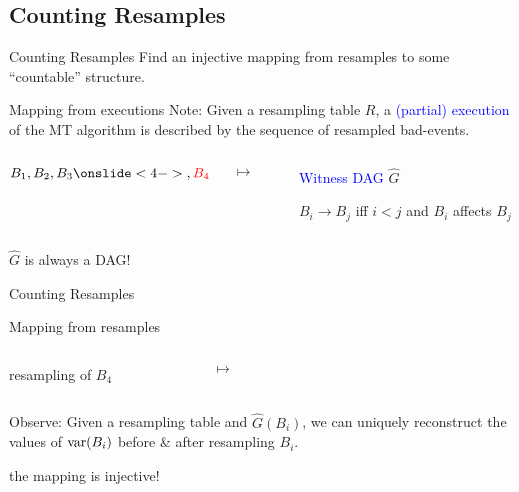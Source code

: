 \documentclass{beamer}
\def\spadding{\vspace{0.25cm}}
\def\b{\textcolor{blue}}
\def\r{\textcolor{red}}
\begin{document}
\subsection{Counting Resamples}
\begin{frame}{Counting Resamples}
Find an injective mapping from resamples to some ``countable'' structure.\pause

\begin{block}{Mapping from executions}
Note: Given a resampling table $R$, a \b{(partial) execution} of the MT algorithm is described by the sequence of resampled bad-events.\spadding

\begin{columns}
\begin{column}{.15\textwidth}
\centering $B_1, B_2, B_3\onslide<4->{, \r{B_4}}$
\end{column}
\begin{column}{.05\textwidth}
\centering $\mapsto$
\end{column}\pause
\begin{column}{.2\textwidth}
\centering\only<-3>{}
\end{column}
\begin{column}{.4\textwidth}
\b{Witness DAG} $\hat{G}$

$B_i \longrightarrow B_j$ iff $i < j$ and $B_i$ affects $B_j$
\end{column}
\end{columns}\pause\pause

\follows $\hat{G}$ is always a DAG!
\end{block}
\end{frame}

\begin{frame}{Counting Resamples}
\begin{block}{Mapping from resamples}
\begin{columns}
\begin{column}{.15\textwidth}
resampling of $B_4$
\end{column}
\begin{column}{.05\textwidth}
\centering $\mapsto$
\end{column}
\begin{column}{.2\textwidth}
\centering
\end{column}
\begin{column}{.1\textwidth}
\end{column}
\end{columns}\pause

Observe: Given a resampling table and $\hat{G}(B_i)$, we can uniquely reconstruct the values of $\mathrm{var}(B_i)$ before \& after resampling $B_i$.\pause\par
\follows the mapping is injective!\pause\spadding

\end{block}
\end{frame}
\end{document}
